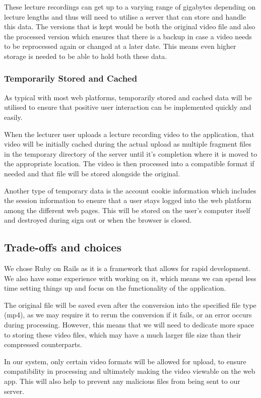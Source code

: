 \documentclass{article}
\begin{document}
These lecture recordings can get up to a varying range of gigabytes depending on lecture lengths and thus will need to utilise a server that can store and handle this data. The versions that is kept would be both the original video file and also the processed version which ensures that there is a backup in case a video needs to be reprocessed again or changed at a later date. This means even higher storage is needed to be able to hold both these data.

\subsubsection{Temporarily Stored and Cached}
As typical with most web platforms, temporarily stored and cached data will be utilised to ensure that positive user interaction can be implemented quickly and easily. 

When the lecturer user uploads a lecture recording video to the application, that video will be initially cached during the actual upload as multiple fragment files in the temporary directory of the server until it's completion where it is moved to the appropriate location. The video is then processed into a compatible format if needed and that file will be stored alongside the original.

Another type of temporary data is the account cookie information which includes the session information to ensure that a user stays logged into the web platform among the different web pages. This will be stored on the user's computer itself and destroyed during sign out or when the browser is closed.

\subsection{Trade-offs and choices}
We chose Ruby on Rails as it is a framework that allows for rapid development. We also have some experience with working on it, which means we can spend less time setting things up and focus on the functionality of the application.

The original file will be saved even after the conversion into the specified file type (mp4), as we may require it to rerun the conversion if it fails, or an error occurs during processing. However, this means that we will need to dedicate more space to storing these video files, which may have a much larger file size than their compressed counterparts.

In our system, only certain video formats will be allowed for upload, to ensure compatibility in processing and ultimately making the video viewable on the web app. This will also help to prevent any malicious files from being sent to our server.
\end{document}
